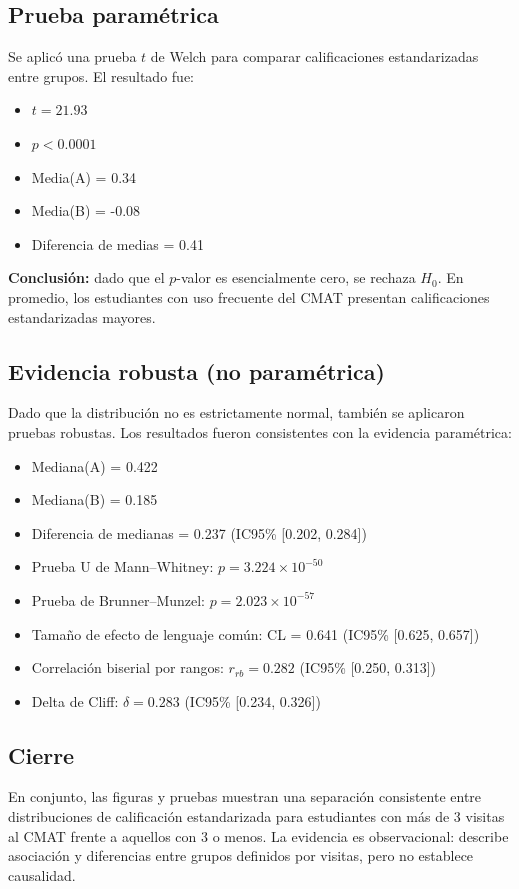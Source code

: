 \documentclass[8pt,a4paper]{article} %
\numberwithin{figure}{subsection}
\begin{document}
\subsection{Prueba paramétrica}

Se aplicó una prueba $t$ de Welch para comparar calificaciones estandarizadas entre grupos. El resultado fue:

\begin{itemize}
  \item $t = 21.93$
  \item $p < 0.0001$
  \item Media(A) = 0.34
  \item Media(B) = -0.08
  \item Diferencia de medias = 0.41
\end{itemize}

\textbf{Conclusión:} dado que el $p$-valor es esencialmente cero, se rechaza $H_0$.
En promedio, los estudiantes con uso frecuente del CMAT presentan calificaciones estandarizadas mayores.

\subsection{Evidencia robusta (no paramétrica)}

Dado que la distribución no es estrictamente normal, también se aplicaron pruebas robustas. Los resultados fueron consistentes con la evidencia paramétrica:

\begin{itemize}
  \item Mediana(A) = 0.422
  \item Mediana(B) = 0.185
  \item Diferencia de medianas = 0.237 (IC95\% [0.202, 0.284])
  \item Prueba U de Mann--Whitney: $p = 3.224 \times 10^{-50}$
  \item Prueba de Brunner--Munzel: $p = 2.023 \times 10^{-57}$
  \item Tamaño de efecto de lenguaje común: CL = 0.641 (IC95\% [0.625, 0.657])
  \item Correlación biserial por rangos: $r_{rb} = 0.282$ (IC95\% [0.250, 0.313])
  \item Delta de Cliff: $\delta = 0.283$ (IC95\% [0.234, 0.326])
\end{itemize}

\subsection{Cierre}

En conjunto, las figuras y pruebas muestran una separación consistente entre distribuciones de calificación estandarizada para estudiantes con más de 3 visitas al CMAT frente a aquellos con 3 o menos.
La evidencia es observacional: describe asociación y diferencias entre grupos definidos por visitas, pero no establece causalidad.
\end{document}
